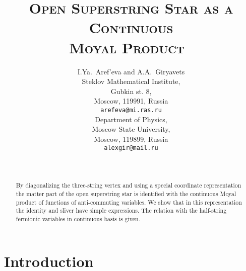 \documentclass[a4paper,12pt]{article}
\begin{document}
\title{
$~$\\
\textsc{Open Superstring Star as a Continuous}
\\
\textsc{Moyal Product}
$~$\\
$~$\\}
\author{
\textsf{I.Ya.~Aref'eva and A.A.~Giryavets}
\vspace{5mm}
\\
Steklov Mathematical Institute,
\\
Gubkin st. 8,\\
Moscow, 119991, Russia
\vspace{1mm}
\\
\texttt{arefeva@mi.ras.ru}
\vspace{6mm}
\\
Department of Physics,\\
Moscow State University,\\
Moscow, 119899, Russia
\vspace{1mm}
\\
\texttt{alexgir@mail.ru} }

\date{~}
\maketitle
\thispagestyle{empty}

\begin{abstract}
By  diagonalizing  the three-string vertex
and using  a special coordinate representation the matter part of
the open superstring star is identified with the
continuous Moyal product of functions of anti-commuting variables.
We show that in this representation the identity and sliver
have simple expressions. The relation with the half-string fermionic
variables in continuous basis is given.
\end{abstract}


\newpage
\tableofcontents

\section{Introduction}
\label{sec:intro}
\setcounter{equation}{0}
\end{document}

